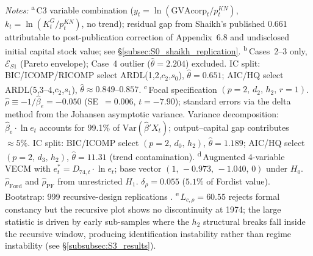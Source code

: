 \begin{table}[H]
\begin{threeparttable}
\begin{tabular}
		\addlinespace[4pt]
		\bottomrule
	\end{tabular}
	
	\begin{tablenotes}
		\footnotesize
		\item \textit{Notes:}
		\textsuperscript{a}\,C3 variable combination
		($y_t = \ln(\text{GVAcorp}_t / p^{KN}_t)$,
		$k_t = \ln(K^G_t / p^{KN}_t)$, no trend); residual gap
		from Shaikh's published $0.661$ attributable to
		post-publication correction of Appendix~6.8 and
		undisclosed initial capital stock value; see
		\S\ref{subsec:S0_shaikh_replication}.
		\textsuperscript{b}\,Cases~2--3 only,
		$\mathcal{E}_{S1}$ (Pareto envelope); Case~4 outlier
		($\hat\theta = 2.204$) excluded. IC split:
		BIC/ICOMP/RICOMP select ARDL(1,2,$c_2$,$s_0$),
		$\hat\theta = 0.651$; AIC/HQ select
		ARDL(5,3--4,$c_2$,$s_1$),
		$\hat\theta \approx 0.849$--$0.857$.
		\textsuperscript{c}\,Focal specification
		$(p{=}2,\,d_2,\,h_2,\,r{=}1)$.
		$\hat\rho \equiv -1/\hat\beta_e = -0.050$
		(SE~$= 0.006$, $t = -7.90$); standard errors via the
		delta method from the Johansen asymptotic variance.
		Variance decomposition: $\hat\beta_e \cdot \ln e_t$
		accounts for 99.1\% of $\text{Var}(\hat\beta' X_t)$;
		output--capital gap contributes $\approx 5\%$. IC split:
		BIC/ICOMP select $(p{=}2,\,d_0,\,h_2)$,
		$\hat\theta = 1.189$; AIC/HQ select
		$(p{=}2,\,d_3,\,h_2)$,
		$\hat\theta = 11.31$ (trend contamination).
		\textsuperscript{d}\,Augmented 4-variable VECM
		with $e^*_t = D_{74,t} \cdot \ln e_t$; base vector
		$(1,\,-0.973,\,-1.040,\,0)$ under $H_0$.
		$\hat\rho_{\mathrm{Ford}}$ and
		$\hat\rho_{\mathrm{PF}}$ from unrestricted $H_1$.
		$\delta_\rho = 0.055$ ($5.1\%$ of Fordist value).
		Bootstrap: 999 recursive-design replications
		\citep{CRT2012}.
		\textsuperscript{e}\,$L_{c,\rho} = 60.55$ rejects
		formal constancy but the recursive plot shows no
		discontinuity at 1974; the large statistic is driven by
		early sub-samples where the $h_2$ structural breaks
		fall inside the recursive window, producing
		identification instability rather than regime
		instability (see \S\ref{subsubsec:S3_results}).
	\end{tablenotes}
	\end{threeparttable}
\end{table}